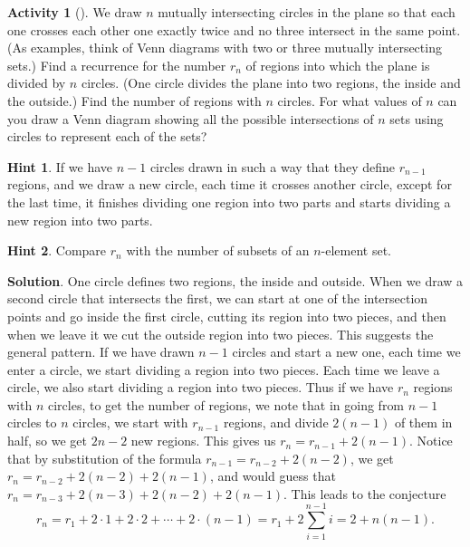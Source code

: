 \documentclass[10pt,]{book}
\theoremstyle{plain}
\theoremstyle{definition}
\theoremstyle{definition}
\theoremstyle{definition}
\newtheorem{activity}[project]{Activity}
\theoremstyle{definition}
\numberwithin{equation}{chapter}
\begin{document}
\begin{activity}[]\label{circlesinplane}
\hypertarget{p-807}{}%
We draw \(n\) mutually intersecting circles in the plane so that each one crosses each other one exactly twice and no three intersect in the same point. (As examples, think of Venn diagrams with two or three mutually intersecting sets.) Find a recurrence for the number \(r_n\) of regions into which the plane is divided by \(n\) circles. (One circle divides the plane into two regions, the inside and the outside.) Find the number of regions with \(n\) circles. For what values of \(n\) can you draw a Venn diagram showing all the possible intersections of \(n\) sets using circles to represent each of the sets?%
\par\smallskip%
\noindent\textbf{Hint 1}.\hypertarget{hint-73}{}\quad%
\hypertarget{p-808}{}%
If we have \(n - 1\) circles drawn in such a way that they define \(r_{n-1}\) regions, and we draw a new circle, each time it crosses another circle, except for the last time, it finishes dividing one region into two parts and starts dividing a new region into two parts.%
\par\smallskip%
\noindent\textbf{Hint 2}.\hypertarget{hint-74}{}\quad%
\hypertarget{p-809}{}%
Compare \(r_n\) with the number of subsets of an \(n\)-element set.%
\par\smallskip%
\noindent\textbf{Solution}.\hypertarget{solution-77}{}\quad%
\hypertarget{p-810}{}%
One circle defines two regions, the inside and outside. When we draw a second circle that intersects the first, we can start at one of the intersection points and go inside the first circle, cutting its region into two pieces, and then when we leave it we cut the outside region into two pieces. This suggests the general pattern. If we have drawn \(n-1\) circles and start a new one, each time we enter a circle, we start dividing a region into two pieces. Each time we leave a circle, we also start dividing a region into two pieces. Thus if we have \(r_n\) regions with \(n\) circles, to get the number of regions, we note that in going from \(n-1\) circles to \(n\) circles, we start with \(r_{n-1}\) regions, and divide \(2(n-1)\) of them in half, so we get \(2n-2\) new regions. This gives us \(r_n=r_{n-1}+2(n-1)\). Notice that by substitution of the formula \(r_{n-1}=r_{n-2} +2(n-2)\), we get \(r_n=r_{n-2}+ 2(n-2) +2(n-1)\), and would guess that \(r_n=r_{n-3}+2(n-3)+2(n-2) +2(n-1)\). This leads to the conjecture%
\begin{equation*}
r_n=r_1  +2\cdot1+2\cdot2+\cdots+2\cdot(n-1)=r_1+2\sum_{i=1}^{n-1}   i=2+n(n-1). 

\end{equation*}
\end{activity}
\end{document}
